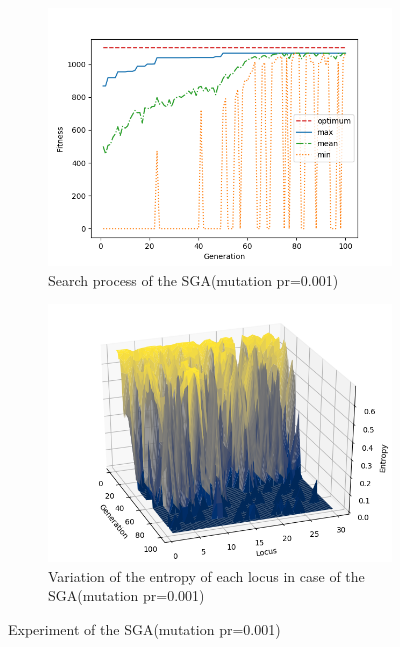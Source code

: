 \documentclass[onecolumn]{ujarticle}   %
\begin{document}
	\begin{figure}[h]
		\begin{subfigure}{0.49\columnwidth}
			\includegraphics[width=1.0\columnwidth]{figure/knapsackSGA_stats_mut_0001_Np_64.png}
			\caption{Search process of the SGA(mutation pr=0.001)}
			\label{fig:searchprocessSGApr0001}
		\end{subfigure}
		\begin{subfigure}{0.49\columnwidth}
			\includegraphics[width=1.0\columnwidth]{figure/knapsackSGA_mut_0001_Np_64.png}
			\caption{Variation of the entropy of each locus in case of the SGA(mutation pr=0.001)}
			\label{fig:entropySGApr0001}
		\end{subfigure}
		\caption{Experiment of the SGA(mutation pr=0.001)}
	\end{figure}
\end{document}
